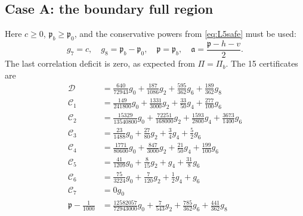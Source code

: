 \documentclass[11pt,a4paper]{article}
\numberwithin{equation}{section}
\theoremstyle{remark}
\begin{document}
\subsection{Case A: the boundary full region}
Here $c\ge0$, $\mathfrak p_b\ge\mathfrak p_0$, and the conservative
powers from \eqref{eq:L5safe} must be used:
\[
 g_7=c,\quad g_8=\mathfrak p_b-\mathfrak p_0,\quad
 \mathfrak p=\mathfrak p_b,\quad
 \mathfrak a=\frac{\mathfrak p-h-v}{2}.
\]
The last correlation deficit is zero, as expected from $\Pi=\Pi_b$.
The 15 certificates are
\begingroup
\small
\begin{align}
\mathcal D &= \frac{640}{72943}g_{0}+\frac{187}{1086}g_{2}+\frac{595}{362}g_{6}+\frac{189}{362}g_{8}\label{cert:boundary:1}\\
\mathcal C_1 &= \frac{149}{241800}g_{0}+\frac{1331}{3000}g_{2}+\frac{33}{50}g_{4}+\frac{277}{100}g_{6}\label{cert:boundary:2}\\
\mathcal C_2 &= \frac{15329}{13540800}g_{0}+\frac{72251}{168000}g_{2}+\frac{1593}{2800}g_{4}+\frac{3673}{1400}g_{6}\label{cert:boundary:3}\\
\mathcal C_3 &= \frac{23}{1488}g_{0}+\frac{27}{80}g_{2}+\frac{3}{4}g_{4}+\frac{5}{2}g_{6}\label{cert:boundary:4}\\
\mathcal C_4 &= \frac{1771}{80600}g_{0}+\frac{847}{3000}g_{2}+\frac{21}{50}g_{4}+\frac{199}{100}g_{6}\label{cert:boundary:5}\\
\mathcal C_5 &= \frac{41}{1209}g_{0}+\frac{8}{15}g_{2}+g_{4}+\frac{31}{8}g_{6}\label{cert:boundary:6}\\
\mathcal C_6 &= \frac{75}{3224}g_{0}+\frac{7}{120}g_{2}+\frac{1}{2}g_{4}+g_{6}\label{cert:boundary:7}\\
\mathcal C_7 &= 0g_{0}\label{cert:boundary:8}\\
\mathfrak p-\frac1{1000} &= \frac{12582057}{72943000}g_{0}+\frac{7}{543}g_{2}+\frac{785}{362}g_{6}+\frac{441}{362}g_{8}\label{cert:boundary:9}\\

\end{align}
\end{document}
